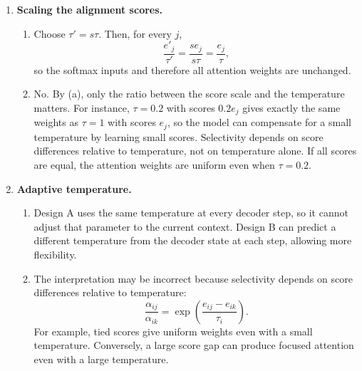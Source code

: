 \documentclass[12pt]{article}
\theoremstyle{definition}
\begin{document}
{\begin{enumerate}[label=\textbf{(\arabic*)}, leftmargin=*]
    \item \textbf{Scaling the alignment scores.}\nopagebreak[4]
    \begin{enumerate}[label=\textbf{(\alph*)}, leftmargin=*]
        \item Choose $\boxed{\tau'=s\tau}$. Then, for every $j$,
        \[
            \frac{e'_j}{\tau'}=\frac{se_j}{s\tau}=\frac{e_j}{\tau},
        \]
        so the softmax inputs and therefore all attention weights are unchanged.

        \item No. By (a), only the ratio between the score scale and the
        temperature matters. For instance, $\tau=0.2$ with scores $0.2e_j$
        gives exactly the same weights as $\tau=1$ with scores $e_j$, so the
        model can compensate for a small temperature by learning small scores.
        Selectivity depends on score differences relative to temperature,
        not on temperature alone. If all scores are equal, the attention
        weights are uniform even when $\tau=0.2$.
    \end{enumerate}

    \item \textbf{Adaptive temperature.}\nopagebreak[4]
    \begin{enumerate}[label=\textbf{(\alph*)}, leftmargin=*]
        \item Design A uses the same temperature at every decoder step, so it
        cannot adjust that parameter to the current context. Design B can
        predict a different temperature from the decoder state at each step,
        allowing more flexibility.

        \item The interpretation may be incorrect because selectivity depends
        on score differences relative to temperature:
        \[
            \frac{\alpha_{ij}}{\alpha_{ik}}
            =\exp\!\left(\frac{e_{ij}-e_{ik}}{\tau_i}\right).
        \]
        For example, tied scores give uniform weights even with a small
        temperature. Conversely, a large score gap can produce focused
        attention even with a large temperature.
    \end{enumerate}
\end{enumerate}
}
\end{document}
